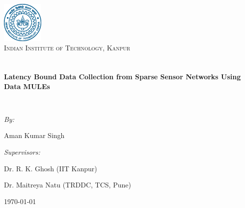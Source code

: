 \begin{titlepage}
\begin{center}

\includegraphics[width=0.15\textwidth]{./logo}~\\[1cm]

\textsc{\LARGE Indian Institute of Technology, Kanpur}\\[1.5cm]

\textsc{\Large }\\[0.5cm]

\HRule \\[0.4cm]
{ \huge \bfseries Latency Bound Data Collection from Sparse Sensor Networks Using Data MULEs \\[0.4cm] }

\HRule \\[1.5cm]

\begin{minipage}{0.4\textwidth}
\begin{flushleft} \large
\emph{By:}

Aman Kumar Singh
\end{flushleft}
\end{minipage}
\begin{minipage}{0.4\textwidth}
\begin{flushright} \large
\emph{Supervisors:}

Dr. R. K. Ghosh (IIT Kanpur)

Dr. Maitreya Natu (TRDDC, TCS, Pune)
\end{flushright}
\end{minipage}

\vfill

{\large \today}

\end{center}
\end{titlepage}
